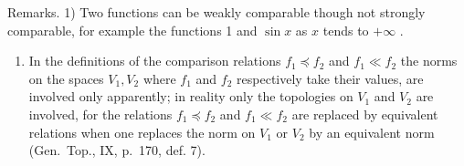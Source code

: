 Remarks. 1) Two functions can be weakly comparable though not strongly comparable, for example the functions 1 and \(\sin x\) as \(x\) tends to \(+\infty\) .

\begin{enumerate}
\def\labelenumi{\arabic{enumi})}
\setcounter{enumi}{1}
\tightlist
\item
  In the definitions of the comparison relations \(f_{1} \preccurlyeq f_{2}\) and \(f_{1} \ll f_{2}\) the norms on the spaces \(V_{1}, V_{2}\) where \(f_{1}\) and \(f_{2}\) respectively take their values, are involved only apparently; in reality only the topologies on \(V_{1}\) and \(V_{2}\) are involved, for the relations \(f_{1} \preccurlyeq f_{2}\) and \(f_{1} \ll f_{2}\) are replaced by equivalent relations when one replaces the norm on \(V_{1}\) or \(V_{2}\) by an equivalent norm (Gen.~Top., IX, p.~170, def. 7).
\end{enumerate}

